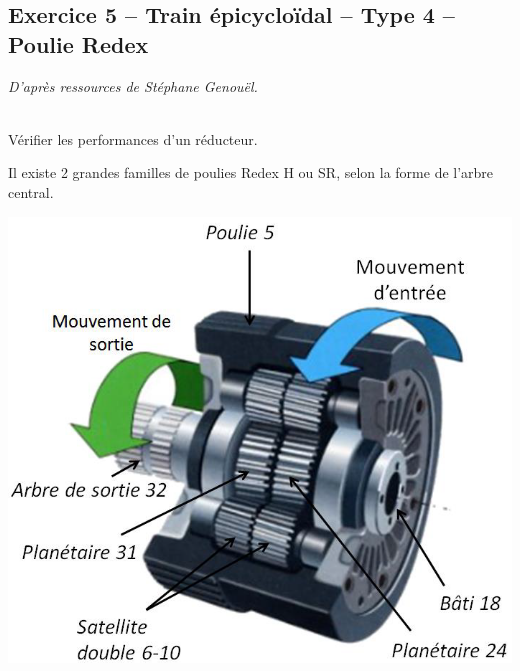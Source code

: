 \documentclass[10pt,fleqn]{article} %
\begin{document}
\def\pathfig{images}

\vspace{4.5cm}
\pagestyle{fancy}
\thispagestyle{plain}

\def\columnseprulecolor{\color{ocre}}
\setlength{\columnseprule}{0.4pt} 

\def\pathfig{images}

\ifprof
\else
\begin{multicols}{2}
\fi


\section*{Exercice 5 -- Train épicycloïdal -- Type 4 -- Poulie Redex}
\setcounter{exo}{0}

\textit{D'après ressources de Stéphane Genouël.}


\begin{obj}~\\
Vérifier les performances d'un réducteur.
\end{obj}

Il existe 2 grandes familles de poulies Redex H ou SR, selon la forme de l’arbre central.


\begin{center}
\includegraphics[width=.7\linewidth]{images/redex_01}
\end{center}




\end{multicols}
\end{document}
